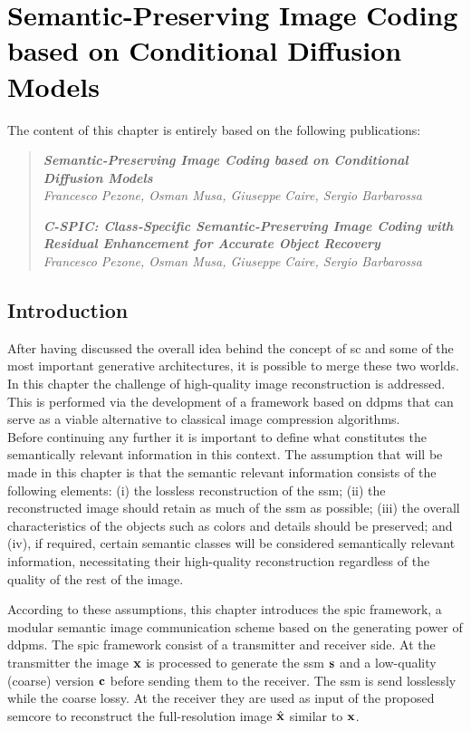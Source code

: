 \chapter{\textcolor{black}{Semantic-Preserving Image Coding based on Conditional Diffusion Models}}\label{ch: SPIC}

The content of this chapter is entirely based on the following publications:
\begin{quotation}
    \noindent \textit{\textbf{\large Semantic-Preserving Image Coding based on Conditional Diffusion Models}}\\
    \textit{Francesco Pezone, Osman Musa, Giuseppe Caire, Sergio Barbarossa}

    \vspace{0.1cm}
    \noindent \textit{\textbf{\large C-SPIC: Class-Specific Semantic-Preserving Image Coding with Residual Enhancement for Accurate Object Recovery}}\\
    \textit{Francesco Pezone, Osman Musa, Giuseppe Caire, Sergio Barbarossa}
\end{quotation}

\section{Introduction}
After having discussed the overall idea behind the concept of \gls{sc} and some of the most important generative architectures, it is possible to merge these two worlds. In this chapter the challenge of high-quality image reconstruction is addressed. This is performed via the development of a framework based on \glspl{ddpm} that can serve as a viable alternative to classical image compression algorithms. \\

Before continuing any further it is important to define what constitutes the semantically relevant information in this context. The assumption that will be made in this chapter is that the semantic relevant information consists of the following elements: (i) the lossless reconstruction of the \gls{ssm}; (ii) the reconstructed image should retain as much of the \gls{ssm} as possible; (iii) the overall characteristics of the objects such as colors and details should be preserved; and (iv), if required, certain semantic classes will be considered semantically relevant information, necessitating their high-quality reconstruction regardless of the quality of the rest of the image.

According to these assumptions, this chapter introduces the \gls{spic} framework, a modular semantic image communication scheme based on the generating power of \glspl{ddpm}. The \gls{spic} framework consist of a transmitter and receiver side. At the transmitter the image $\mathbf{x}$ is processed to generate the \gls{ssm} $\mathbf{s}$ and a low-quality (coarse) version $\mathbf{c}$ before sending them to the receiver. The \gls{ssm} is send losslessly while the coarse lossy. At the receiver they are used as input of the proposed  \gls{semcore} to reconstruct the full-resolution image $\hat{\mathbf{x}}$ similar to $\mathbf{x}$.\\

